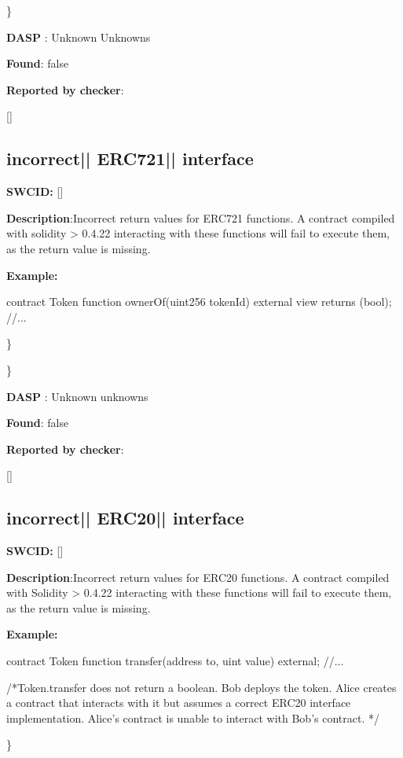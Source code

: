 \documentclass{article}
\begin{document}
\} 

\textbf{DASP} : Unknown Unknowns

\textbf{Found}: false

\textbf{Reported by checker}: 
\begin{ffcode} 

[]
\end{ffcode} 
\subsection{incorrect{|\textunderscore| }ERC721{|\textunderscore| }interface} 
\textbf{SWC{\textunderscore }ID:} []

\textbf{Description}:Incorrect return values for ERC721 functions. A contract compiled with solidity > 0.4.22 interacting with these functions will fail to execute them, as the return value is missing.


\textbf{Example:} 
\begin{ffcode} 

contract Token{
    function ownerOf(uint256 \textunderscore tokenId) external view returns (bool);
    //...
}

\end{ffcode} 
\} 

\} 

\textbf{DASP} : Unknown unknowns

\textbf{Found}: false

\textbf{Reported by checker}: 
\begin{ffcode} 

[]
\end{ffcode} 
\subsection{incorrect{|\textunderscore| }ERC20{|\textunderscore| }interface} 
\textbf{SWC{\textunderscore }ID:} []

\textbf{Description}:Incorrect return values for ERC20 functions. A contract compiled with Solidity > 0.4.22 interacting with these functions will fail to execute them, as the return value is missing.


\textbf{Example:} 
\begin{ffcode} 

contract Token{
    function transfer(address to, uint value) external;
    //...
}

 /*Token.transfer does not return a boolean. Bob deploys the token. Alice creates a contract that interacts with it but assumes a correct ERC20 interface implementation. Alice's contract is unable to interact with Bob's contract. */ 

\end{ffcode} 
\} 
\end{document}
